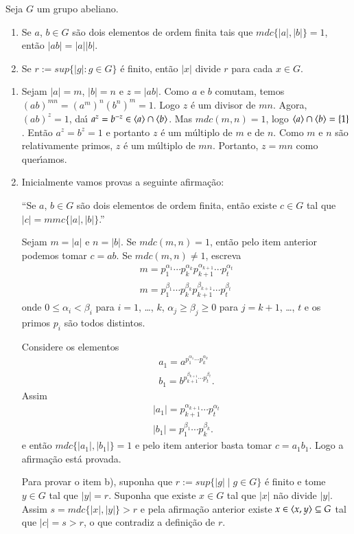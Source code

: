 \begin{proposicao}
	Seja $G$ um grupo abeliano.
	\begin{enumerate}[label=({\roman*})]
		\item Se $a$, $b \in G$ s\~ao dois elementos de ordem finita tais que $mdc\{|a|, |b|\} = 1$, ent\~ao $|ab| = |a||b|$.
		\item Se $r:= sup\{|g| : g \in G\}$ \'e finito, ent\~ao $|x|$ divide $r$ para cada $x \in G$.
	\end{enumerate}
\end{proposicao}
\begin{prova}
	\begin{enumerate}[label=({\roman*})]
		\item Sejam $|a| = m$, $|b| = n$ e $z = |ab|$. Como $a$ e $b$ comutam, temos $(ab)^{mn} = (a^m)^n(b^n)^m = 1$. Logo $z$ \'e um divisor de $mn$. Agora, $(ab)^z = 1$, da{\'\i} $a^z = b^{-z} \in \langle{a}\rangle\cap\langle{b}\rangle$. Mas $mdc(m,n) = 1$, logo $\langle{a}\rangle\cap\langle{b}\rangle = \{1\}$. Ent\~ao $a^z = b^z = 1$ e portanto $z$ \'e um m\'ultiplo de $m$ e de $n$. Como $m$ e $n$ s\~ao relativamente primos, $z$ \'e um m\'ultiplo de $mn$. Portanto, $z = mn$ como quer{\'\i}amos.
		\item Inicialmente vamos provas a seguinte afirma\c{c}\~ao:

		``Se $a$, $b \in G$ s\~ao dois elementos de ordem finita, ent\~ao existe $c \in G$ tal que $|c| = mmc\{|a|, |b|\}$.''

		Sejam $m = |a|$ e $n = |b|$. Se $mdc(m, n) = 1$, ent\~ao pelo item anterior podemos tomar $c = ab$. Se $mdc(m, n) \ne 1$, escreva
		\begin{align*}
			m = p_1^{\alpha_1}\cdots p_k^{\alpha_k}p_{k + 1}^{\alpha_{k + 1}}\cdots p_t^{\alpha_t}\\
			m = p_1^{\beta_1}\cdots p_k^{\beta_k}p_{k + 1}^{\beta_{k + 1}}\cdots p_t^{\beta_t}
		\end{align*}
		onde $0 \le \alpha_i < \beta_i$ para $i = 1$, \dots, $k$, $\alpha_j \ge \beta_j \ge 0$ para $j = k + 1$, \dots, $t$ e os primos $p_i$ s\~ao todos distintos.

		Considere os elementos
		\begin{align*}
			a_1 = a^{p_1^{\alpha_1}\cdots p_k^{\alpha_k}}\\
			b_1 = b^{p_{k + 1}^{\beta_{k + 1}}\cdots p_t^{\beta_t}}.
		\end{align*}
		Assim
		\begin{align*}
			|a_1| = p_{k + 1}^{\alpha_{k + 1}}\cdots p_t^{\alpha_t}\\
			|b_1| = p_1^{\beta_1}\cdots p_k^{\beta_k}.
		\end{align*}
		e ent\~ao $mdc\{|a_1|, |b_1|\} = 1$  e pelo item anterior basta tomar $c = a_1b_1$. Logo a afirma\c{c}\~ao est\'a provada.

		Para provar o item b), suponha que $r := sup\{|g| \mid g \in G\}$ \'e finito e tome $y \in G$ tal que $|y| = r$. Suponha que existe $x \in G$ tal que $|x|$ n\~ao divide $|y|$. Assim $s = mdc\{|x|, |y|\} > r$ e pela afirma\c{c}\~ao anterior existe $x \in \langle{x, y}\rangle \subseteq G$ tal que $|c| = s > r$, o que contradiz a defini\c{c}\~ao de $r$.
	\end{enumerate}
\end{prova}

